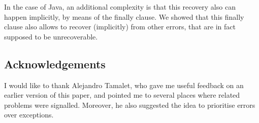 \documentclass[]{llncs}
\begin{document}
In the case of Java, an additional complexity is that this recovery
also can happen implicitly, by means of the finally clause. We showed
that this finally clause also allows to recover (implicitly) from
other errors, that are in fact supposed to be unrecoverable.

\subsection*{Acknowledgements}
I would like to thank Alejandro Tamalet, who gave me useful feedback
on an earlier version of this paper, and pointed me to several places
where related problems were signalled. Moreover, he also suggested the
idea to prioritise errors over exceptions.



\end{document}
